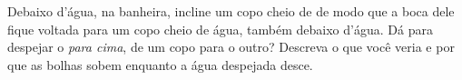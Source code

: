 \begin{exercise}[$\star\star$]\label{exo:g2:air-around-us:10}
Debaixo d'água, na banheira, incline um copo cheio de  de modo que
a boca dele fique voltada para um copo cheio de água, também debaixo
d'água. Dá para despejar o  \emph{para cima}, de um copo para o
outro? Descreva o que você veria e por que as bolhas sobem enquanto a
água despejada desce.
\end{exercise}
